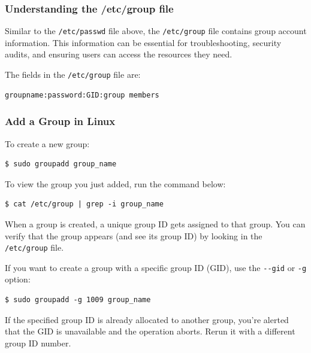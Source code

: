 \documentclass{article}
\newenvironment{blocktemplate}[1]{%
    \tcolorbox[beamer,%
    noparskip,breakable,
    colframe=Blue,%
    colbacklower=LimeGreen!75!LightGreen,%
    title=#1]}%
    {\endtcolorbox}
\newenvironment{blocktemplateIII}[1]{%
    \tcolorbox[beamer,%
    noparskip,breakable,
    ,colframe=Red,%
    colbacklower=LimeGreen!75!LightGreen,%
    title=#1]}%
    {\endtcolorbox}
\newenvironment{codetemplate}[1][]{%
  \mybasecolorbox[#1]
  \itshape
}{%
  \endmybasecolorbox
}
\begin{document}
\subsubsection{Understanding the /etc/group file}
Similar to the \verb|/etc/passwd| file above, the \verb|/etc/group| file contains group account information. This information can be essential for troubleshooting, security audits, and ensuring users can access the resources they need.

The fields in the \verb|/etc/group| file are:
\begin{codetemplate}{}
\begin{verbatim}
groupname:password:GID:group members
\end{verbatim}
\end{codetemplate}

\subsubsection{Add a Group in Linux}
To create a new group:
\begin{codetemplate}{}
\begin{verbatim}
$ sudo groupadd group_name
\end{verbatim}
\end{codetemplate}

To view the group you just added, run the command below:
\begin{codetemplate}{}
\begin{verbatim}
$ cat /etc/group | grep -i group_name
\end{verbatim}
\end{codetemplate}

\begin{blocktemplate}{NOTE}
When a group is created, a unique group ID gets assigned to that group. You can verify that the group appears (and see its group ID) by looking in the \verb|/etc/group| file.
\end{blocktemplate}

If you want to create a group with a specific group ID (GID), use the \verb|--gid| or \verb|-g| option:

\begin{codetemplate}{}
\begin{verbatim}
$ sudo groupadd -g 1009 group_name
\end{verbatim}
\end{codetemplate}

\begin{blocktemplateIII}{WARNING}
If the specified group ID is already allocated to another group, you're alerted that the GID is unavailable and the operation aborts. Rerun it with a different group ID number.
\end{blocktemplateIII}
\end{document}
